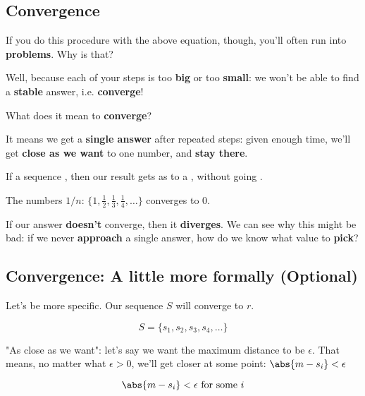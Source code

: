 \subsection*{Convergence}

    If you do this procedure with the above equation, though, you'll often run into \textbf{problems}. Why is that?
    
    Well, because each of your steps is too \textbf{big} or too \textbf{small}: we won't be able to find a \textbf{stable} answer, i.e. \textbf{converge}!
    
    What does it mean to \textbf{converge}? 
    
    It means we get a \textbf{single answer} after repeated steps: given enough time, we'll get \textbf{close as we want} to one number, and \textbf{stay there}.\\
    
    \begin{definition}
        If a sequence , then our result gets as  to a , without going .
    \end{definition}
    
    \miniex The numbers $1/n$: $\{ 1, \frac{1}{2}, \frac{1}{3}, \frac{1}{4}, \dots  \}$ converges to 0.
    
    If our answer \textbf{doesn't} converge, then it \textbf{diverges}. We can see why this might be bad: if we never \textbf{approach} a single answer, how do we know what value to \textbf{pick}?
    
\subsection*{Convergence: A little more formally (Optional)}
    
    Let's be more specific. Our sequence $S$ will converge to $r$.
    
    \begin{equation}
        S = \{ s_1, s_2, s_3, s_4, \dots \} 
    \end{equation}
    
    "As close as we want": let's say we want the maximum distance to be $\epsilon$. That means, no matter what $\epsilon>0$, we'll get closer at some point: $\abs{m-s_i}<\epsilon$
    
    \begin{equation}
        \abs{m-s_i}<\epsilon \text{ for some } i
    \end{equation}
    
